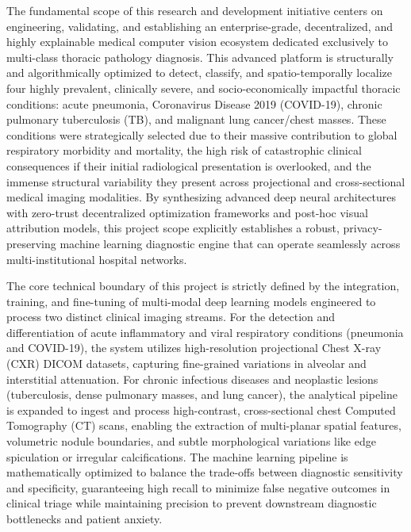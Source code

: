 The fundamental scope of this research and development initiative centers on engineering, validating, and establishing an enterprise-grade, decentralized, and highly explainable medical computer vision ecosystem dedicated exclusively to multi-class thoracic pathology diagnosis. This advanced platform is structurally and algorithmically optimized to detect, classify, and spatio-temporally localize four highly prevalent, clinically severe, and socio-economically impactful thoracic conditions: acute pneumonia, Coronavirus Disease 2019 (COVID-19), chronic pulmonary tuberculosis (TB), and malignant lung cancer/chest masses. These conditions were strategically selected due to their massive contribution to global respiratory morbidity and mortality, the high risk of catastrophic clinical consequences if their initial radiological presentation is overlooked, and the immense structural variability they present across projectional and cross-sectional medical imaging modalities. By synthesizing advanced deep neural architectures with zero-trust decentralized optimization frameworks and post-hoc visual attribution models, this project scope explicitly establishes a robust, privacy-preserving machine learning diagnostic engine that can operate seamlessly across multi-institutional hospital networks.

The core technical boundary of this project is strictly defined by the integration, training, and fine-tuning of multi-modal deep learning models engineered to process two distinct clinical imaging streams. For the detection and differentiation of acute inflammatory and viral respiratory conditions (pneumonia and COVID-19), the system utilizes high-resolution projectional Chest X-ray (CXR) DICOM datasets, capturing fine-grained variations in alveolar and interstitial attenuation. For chronic infectious diseases and neoplastic lesions (tuberculosis, dense pulmonary masses, and lung cancer), the analytical pipeline is expanded to ingest and process high-contrast, cross-sectional chest Computed Tomography (CT) scans, enabling the extraction of multi-planar spatial features, volumetric nodule boundaries, and subtle morphological variations like edge spiculation or irregular calcifications. The machine learning pipeline is mathematically optimized to balance the trade-offs between diagnostic sensitivity and specificity, guaranteeing high recall to minimize false negative outcomes in clinical triage while maintaining precision to prevent downstream diagnostic bottlenecks and patient anxiety.

